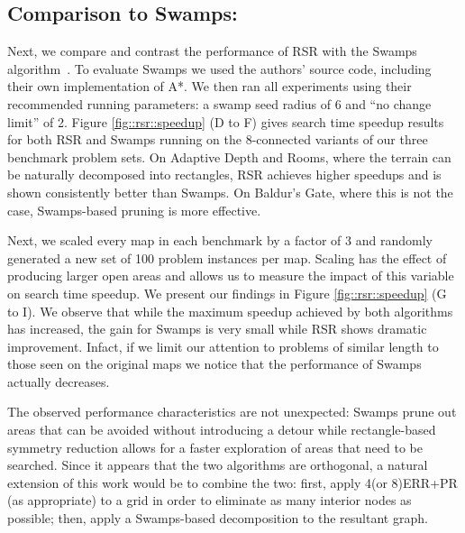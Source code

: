 \subsection{Comparison to Swamps:}
Next, we compare and contrast the performance of RSR with the Swamps
algorithm~\citep{pochter10}.  To evaluate Swamps we used the authors' source
code, including their own implementation of A*.  We then ran all experiments
using their recommended running parameters: a swamp seed radius of 6 and ``no
change limit'' of 2.
Figure \ref{fig::rsr::speedup} (D to F) gives search time speedup results for both RSR
and Swamps running on the 8-connected variants of our three benchmark problem
sets. 
On Adaptive Depth and Rooms, where the terrain can be naturally decomposed into
rectangles, RSR achieves higher speedups and is shown consistently better than Swamps. 
On Baldur's Gate, where this is not the case, Swamps-based pruning is more
effective. 
\par
Next, we scaled every map in each benchmark by a factor of 3 and randomly
generated a new set of 100 problem instances per map.  Scaling has the effect of
producing larger open areas and allows us to measure the impact of this variable
on search time speedup.  We present our findings in  Figure \ref{fig::rsr::speedup} (G
to I).  We observe that while the maximum speedup achieved by both algorithms
has increased, the gain for Swamps is very small while RSR shows dramatic
improvement.  Infact, if we limit our attention to problems of similar length to
those seen on the original maps we notice that the performance of Swamps
actually decreases.
\par
The observed performance characteristics are not unexpected: Swamps prune out
areas that can be avoided without introducing a detour while rectangle-based
symmetry reduction allows for a faster exploration of areas that need to be
searched.  Since it appears that the two algorithms are orthogonal, a natural
extension of this work would be to combine the two: first, apply 4(or 8)ERR+PR
(as appropriate) to a grid in order to eliminate as many interior nodes as
possible; then, apply a Swamps-based decomposition to the resultant graph.



